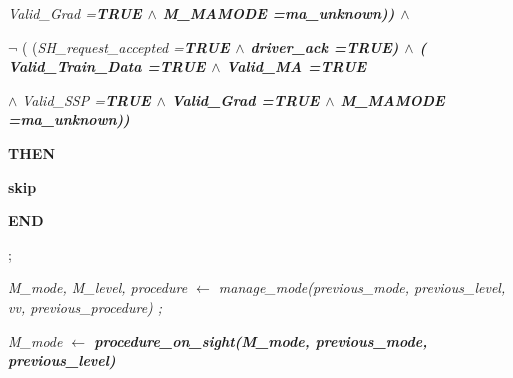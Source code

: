 \documentclass[11pt]{article}
\begin{document}
\begin{sloppypar}
\hspace*{1.40in}\it Valid\_Grad \rm =\hspace*{0.10in}\bf TRUE  $\land$  \it M\_MAMODE \rm =\hspace*{0.10in}\it ma\_unknown\rm )\hspace*{0.10in}\rm )  $\land$ 

\hspace*{0.60in}\hspace*{0.60in} $\neg$ \rm ( \rm (\it SH\_request\_accepted \rm =\hspace*{0.10in}\bf TRUE  $\land$  \it driver\_ack \rm =\hspace*{0.10in}\bf TRUE\rm )  $\land$  \rm ( \it Valid\_Train\_Data \rm =\hspace*{0.10in}\bf TRUE  $\land$  \it Valid\_MA \rm =\hspace*{0.10in}\bf TRUE 

\hspace*{1.20in} $\land$  \it Valid\_SSP \rm =\hspace*{0.10in}\bf TRUE  $\land$ \hspace*{0.15in}\it Valid\_Grad \rm =\hspace*{0.10in}\bf TRUE  $\land$  \it M\_MAMODE \rm =\hspace*{0.10in}\it ma\_unknown\rm )\hspace*{0.10in}\rm )

\hspace*{0.40in}\bf THEN

\hspace*{0.60in}\bf skip

\hspace*{0.40in}\bf END\hspace*{0.15in}

\hspace*{0.35in}\rm ;

\hspace*{0.35in}\it M\_mode\rm , \it M\_level\rm , \it procedure\hspace*{0.10in} $\leftarrow$  \it manage\_mode\rm (\it previous\_mode\rm , \it previous\_level\rm , \it vv\rm , \it previous\_procedure\rm ) \rm ;

\hspace*{0.35in}

\hspace*{0.35in}\hspace*{0.35in}\hspace*{0.35in}\hspace*{0.35in}\hspace*{0.35in}\hspace*{0.35in}\hspace*{0.35in}\it M\_mode  $\leftarrow$  \bf procedure\_on\_sight\rm (\it M\_mode\rm , \it previous\_mode\rm , \it previous\_level\rm ) 


\end{sloppypar}
\end{document}
